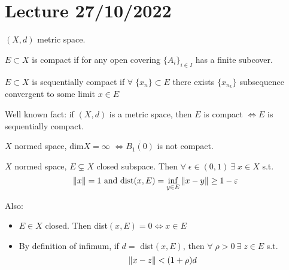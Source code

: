 \section{Lecture 27/10/2022}

\(\left(X, d\right)\) metric space.
\begin{definition}
    \(E \subset X\) is compact if for any open covering \(\{A_i\}_{i \in I}\) has a finite subcover.
\end{definition}

\begin{definition}
    \(E \subset X\) is sequentially compact if \(\forall \; \{x_n\} \subset E \) 
    there exists \(\{x_{n_k}\}\) subsequence convergent to some limit \(x \in E\)
\end{definition}

Well known fact: if \(\left(X, d\right)\) is a metric space, then \(E\) is compact \(\Leftrightarrow E \) is sequentially compact.

\begin{theorem}
    \(X\) normed space, dim\(X = \infty\) \(\Leftrightarrow \overline{B_1(0)}\) is not compact. 
\end{theorem}

\begin{lemma}
    \(X\) normed space, \(E \subsetneq X\) closed subspace. Then \(\forall \; \epsilon \in \left(0, 1\right) \ \exists \; x \in X \) s.t. 
    \[
        \norm{x}=1 \text{ and } \text{dist}(x, E) = \inf_{y \in E} \norm{x-y} \geq 1- \varepsilon\]
\end{lemma}

\begin{remark}
    Also:
    \begin{itemize}
        \item \(E \in X\) closed. Then dist\((x, E)=0 \Leftrightarrow x \in E\)
        \item By definition of infimum, if \(d =\) dist\((x, E)\), then \(\forall \; \rho >0 \ \exists \; z \in E\) s.t. 
        \[
            \norm{x-z} < (1+\rho) d
        \]
    \end{itemize}
\end{remark}

